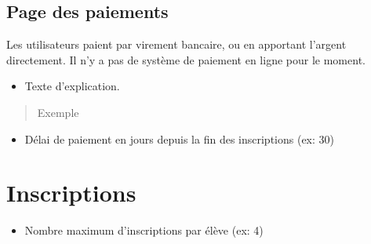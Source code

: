 \documentclass[letterpaper,10pt,english]{sphinxmanual}
\begin{document}
\subsection{Page des paiements}
\label{\detokenize{configurer:page-des-paiements}}
Les utilisateurs paient par virement bancaire, ou en apportant l’argent directement. Il n’y a pas de système de paiement en ligne pour le moment.
\begin{itemize}
\item {} 
Texte d’explication.

\end{itemize}
\begin{quote}\begin{description}
\item[{Exemple}] \leavevmode
{}

\end{description}\end{quote}
\begin{itemize}
\item {} 
Délai de paiement en jours depuis la fin des inscriptions (ex: 30)

\end{itemize}


\section{Inscriptions}
\label{\detokenize{configurer:inscriptions}}\begin{itemize}
\item {} 
Nombre maximum d’inscriptions par élève (ex: 4)

\end{itemize}
\end{document}
